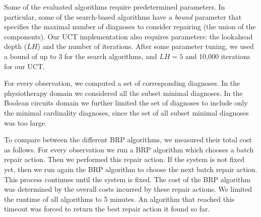 \documentclass[review]{elsarticle}
\newcommand\meir[1]{\textcolor{red}{meir: #1}}
\begin{document}
Some of the evaluated algorithms require predetermined parameters. In particular, some of the search-based algorithms have a \emph{bound} parameter that specifies the maximal number of diagnoses to consider repairing (the union of the components). Our UCT implementation also requires parameters: the lookahead depth ($LH$) 
and the number of iterations. 
After some parameter tuning, we used a bound of up to 3 for the search algorithms, and $LH=5$ and 10,000 iterations for our UCT. 


 For every observation, we computed a set of corresponding diagnoses. In the physiotherapy domain we considered all the subset minimal diagnoses.  
In the Boolean circuits domain we further limited the set of diagnoses to include only the minimal cardinality diagnoses, since the set of all subset minimal diagnoses was too large. 

To compare between the different BRP algorithms, we measured their total cost as follows. 
For every observation we run a BRP algorithm which chooses a batch repair action. Then we performed this repair action. If the system is not fixed yet, then we run again the BRP algorithm to choose the next batch repair action. This process continues until the system is fixed. The cost of the BRP algorithm was determined by the overall costs incurred by these repair actions. We limited the runtime of all algorithms to 5 minutes. 
An algorithm that reached this timeout was forced to return the best repair action it found so far. 

\end{document}
